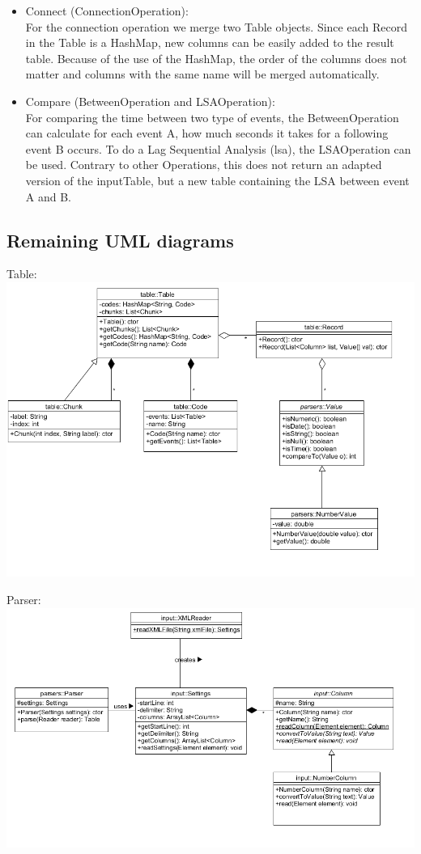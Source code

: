 \documentclass[11pt,twoside,a4paper]{article}
\begin{document}
\begin{itemize}
\item Connect (ConnectionOperation):\\
For the connection operation we merge two Table objects. Since each Record in the Table is a HashMap, new columns can be easily added to the result table. Because of the use of the HashMap, the order of the columns does not matter and columns with the same name will be merged automatically.

\item Compare (BetweenOperation and LSAOperation):\\
For comparing the time between two type of events, the BetweenOperation can calculate for each event A, how much seconds it takes for a following event B occurs. To do a Lag Sequential Analysis (lsa), the LSAOperation can be used. Contrary to other Operations, this does not return an adapted version of the inputTable, but a new table containing the LSA between event A and B.

\end{itemize}

\newpage
\subsection{Remaining UML diagrams}
Table:\\
\includegraphics[scale=0.8, center]{Table_diagram.PNG}

Parser:\\
\includegraphics[scale=0.8, center]{Parser_diagram.PNG}
\end{document}
